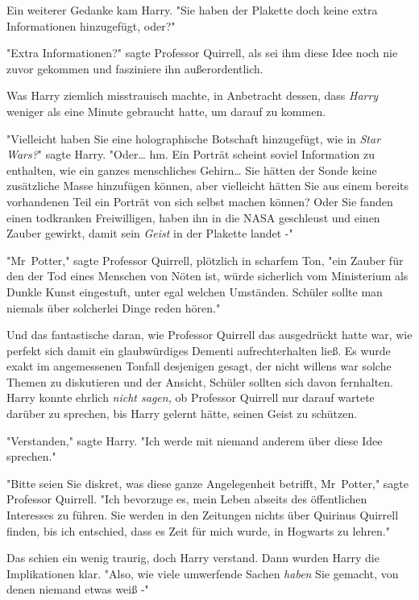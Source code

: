 {Ein weiterer Gedanke kam Harry. "Sie haben der Plakette doch keine extra Informationen hinzugefügt, oder?"

"Extra Informationen?" sagte Professor Quirrell, als sei ihm diese Idee noch nie zuvor gekommen und fasziniere ihn außerordentlich.

Was Harry ziemlich misstrauisch machte, in Anbetracht dessen, dass \emph{Harry} weniger als eine Minute gebraucht hatte, um darauf zu kommen.

"Vielleicht haben Sie eine holographische Botschaft hinzugefügt, wie in \emph{Star Wars?}" sagte Harry. "Oder… hm. Ein Porträt scheint soviel Information zu enthalten, wie ein ganzes menschliches Gehirn… Sie hätten der Sonde keine zusätzliche Masse hinzufügen können, aber vielleicht hätten Sie aus einem bereits vorhandenen Teil ein Porträt von sich selbst machen können? Oder Sie fanden einen todkranken Freiwilligen, haben ihn in die NASA geschleust und einen Zauber gewirkt, damit sein \emph{Geist} in der Plakette landet -"

"Mr~Potter," sagte Professor Quirrell, plötzlich in scharfem Ton, "ein Zauber für den der Tod eines Menschen von Nöten ist, würde sicherlich vom Ministerium als Dunkle Kunst eingestuft, unter egal welchen Umständen. Schüler sollte man niemals über solcherlei Dinge reden hören."

Und das fantastische daran, wie Professor Quirrell das ausgedrückt hatte war, wie perfekt sich damit ein glaubwürdiges Dementi aufrechterhalten ließ. Es wurde exakt im angemessenen Tonfall desjenigen gesagt, der nicht willens war solche Themen zu diskutieren und der Ansicht, Schüler sollten sich davon fernhalten. Harry konnte ehrlich \emph{nicht sagen,} ob Professor Quirrell nur darauf wartete darüber zu sprechen, bis Harry gelernt hätte, seinen Geist zu schützen.

"Verstanden," sagte Harry. "Ich werde mit niemand anderem über diese Idee sprechen."

"Bitte seien Sie diskret, was diese ganze Angelegenheit betrifft, Mr~Potter," sagte Professor Quirrell. "Ich bevorzuge es, mein Leben abseits des öffentlichen Interesses zu führen. Sie werden in den Zeitungen nichts über Quirinus Quirrell finden, bis ich entschied, dass es Zeit für mich wurde, in Hogwarts zu lehren."

Das schien ein wenig traurig, doch Harry verstand. Dann wurden Harry die Implikationen klar. "Also, wie viele umwerfende Sachen \emph{haben} Sie gemacht, von denen niemand etwas weiß -"

}
